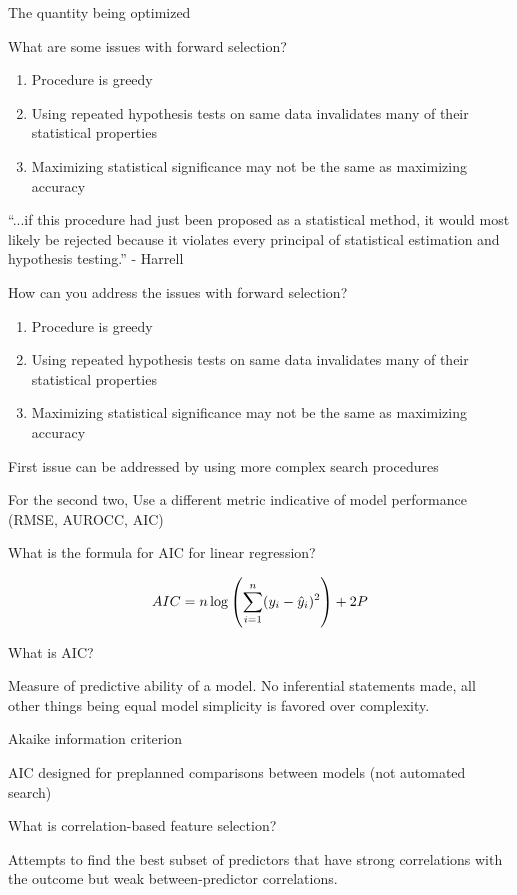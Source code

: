 \documentclass[10pt]{book}
\begin{document}
The quantity being optimized

\hrulefill

What are some issues with forward selection?

\begin{enumerate}
    \item Procedure is greedy
    \item Using repeated hypothesis tests on same data invalidates many of their statistical properties
    \item Maximizing statistical significance may not be the same as maximizing accuracy
\end{enumerate}

``...if this procedure had just been proposed as a statistical method, it would most likely be rejected because it violates every principal of statistical estimation and hypothesis testing.'' - Harrell


\hrulefill

How can you address the issues with forward selection?

\begin{enumerate}
    \item Procedure is greedy
    \item Using repeated hypothesis tests on same data invalidates many of their statistical properties
    \item Maximizing statistical significance may not be the same as maximizing accuracy
\end{enumerate}

First issue can be addressed by using more complex search procedures

For the second two, Use a different metric indicative of model performance (RMSE, AUROCC, AIC)


\hrulefill

What is the formula for AIC for linear regression?

\[
  AIC = n \log \del{\sum_{i=1}^{n}(y_{i}-\hat{y}_{i})^2} + 2P
\]

\hrulefill

What is AIC?

Measure of predictive ability of a model. No inferential statements made, all other things being equal model simplicity is favored over complexity.

Akaike information criterion

AIC designed for preplanned comparisons between models (not automated search)

\hrulefill

What is correlation-based feature selection?

Attempts to find the best subset of predictors that have strong correlations with the outcome but weak between-predictor correlations. 

\hrulefill




\end{document}
